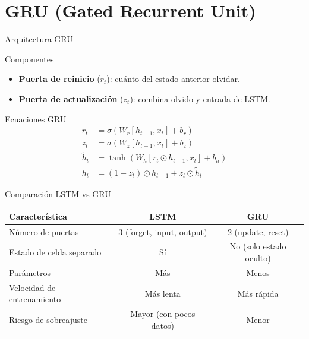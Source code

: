 \documentclass[aspectratio=169, 10pt, xcolor=table]{beamer}
\begin{document}
\section{GRU (Gated Recurrent Unit)}

\begin{frame}{Arquitectura GRU}
    \begin{block}{Componentes}
        \begin{itemize}
            \item \textbf{Puerta de reinicio} ($r_t$): cuánto del estado anterior olvidar.
            \item \textbf{Puerta de actualización} ($z_t$): combina olvido y entrada de LSTM.
        \end{itemize}
    \end{block}
\end{frame}

\begin{frame}{Ecuaciones GRU}
    \begin{align*}
        r_t &= \sigma(W_r[h_{t-1}, x_t] + b_r) \\
        z_t &= \sigma(W_z[h_{t-1}, x_t] + b_z) \\
        \tilde{h}_t &= \tanh(W_h[r_t \odot h_{t-1}, x_t] + b_h) \\
        h_t &= (1 - z_t) \odot h_{t-1} + z_t \odot \tilde{h}_t
    \end{align*}
\end{frame}

\begin{frame}{Comparación LSTM vs GRU}
    \begin{table}
        \centering
        \begin{tabular}{l|c|c}
            \toprule
            \textbf{Característica} & \textbf{LSTM} & \textbf{GRU} \\
            \midrule
            Número de puertas & 3 (forget, input, output) & 2 (update, reset) \\
            Estado de celda separado & Sí & No (solo estado oculto) \\
            Parámetros & Más & Menos \\
            Velocidad de entrenamiento & Más lenta & Más rápida \\
            Riesgo de sobreajuste & Mayor (con pocos datos) & Menor \\
            \bottomrule
        \end{tabular}
    \end{table}
\end{frame}
\end{document}
